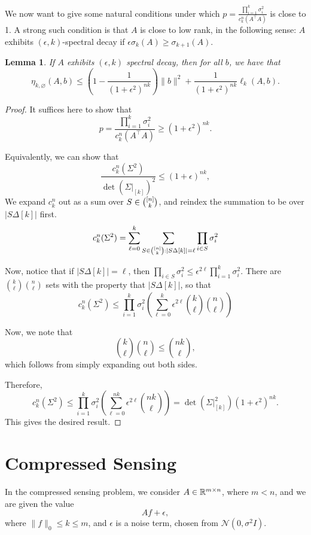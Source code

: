 \documentclass{amsart}
\newtheorem{lemma}[thm]{Lemma}
\theoremstyle{definition}
\numberwithin{equation}{section}
\begin{document}
We now want to give some natural conditions under which $p = \frac{\prod_{i=1}^k \sigma_i^2}{c_k^n(A^{\intercal}A)}$ is close to 1.
A strong such condition is that $A$ is close to low rank, in the following sense: $A$ exhibits $(\epsilon, k)$-spectral decay if $\epsilon \sigma_{k}(A) \ge \sigma_{k+1}(A)$.
\begin{lemma}
    If $A$ exhibits $(\epsilon, k)$ spectral decay, then for all $b$, we have that 
    \[
        \eta_{k, \varnothing}(A, b) \le (1-\frac{1}{(1+\epsilon^2)^{nk}}) \|b\|^2 + \frac{1}{(1+\epsilon^2)^{nk}}\ell_k(A, b).
    \]
\end{lemma}
\begin{proof}
    It suffices here to show that 
    \[
        p = \frac{\prod_{i=1}^k \sigma_i^2}{c_k^n(A^{\intercal}A)} \ge (1+\epsilon^2)^{nk}.
    \]

    Equivalently, we can show that
    \[
        \frac{c_k^n(\Sigma^2)}{\det(\Sigma|_{[k]})^2} \le (1+\epsilon)^{nk},
    \]
    We expand $c_k^n$ out as a sum over $S \in \binom{[n]}{k}$, and reindex the summation to be over $|S \Delta [k]|$ first.
    \begin{align*}
        c_k^n(\Sigma^2) = \sum_{\ell = 0}^k\sum_{S \in \binom{[n]}{k} : |S \Delta [k]| = \ell} \prod_{i\in S}\sigma_i^2
    \end{align*}

    Now, notice that if $|S\Delta [k]| = \ell$, then $\prod_{i\in S}\sigma_i^2 \le \epsilon^{2\ell}\prod_{i=1}^k \sigma_i^2$.
    There are $\binom{k}{\ell} \binom{n}{\ell}$ sets with the property that $|S\Delta [k]|$, so that 
    \[
        c_k^n(\Sigma^2) \le \prod_{i=1}^k \sigma_i^2 \left(\sum_{\ell=0}^k\epsilon^{2\ell}\binom{k}{\ell} \binom{n}{\ell}\right)
    \]

    Now, we note that 
    \[
        \binom{k}{\ell} \binom{n}{\ell} \le \binom{nk}{\ell},
    \]
    which follows from simply expanding out both sides.

    Therefore, 
    \[
        c_k^n(\Sigma^2) \le \prod_{i=1}^k \sigma_i^2 \left(\sum_{\ell=0}^{nk}\epsilon^{2\ell}\binom{nk}{\ell}\right) = \det(\Sigma|_{[k]}^2) (1+\epsilon^2)^{nk}.
    \]
    This gives the desired result. 
\end{proof}

\section{Compressed Sensing}
In the compressed sensing problem, we consider $A \in \mathbb{R}^{m\times n}$, where $m < n$, and we are given the value 
\[
    Af + \epsilon,
\]
where $\|f\|_0 \le k \le m$, and $\epsilon$ is a noise term, chosen from $\mathcal{N}(0, \sigma^2I)$.
\end{document}
